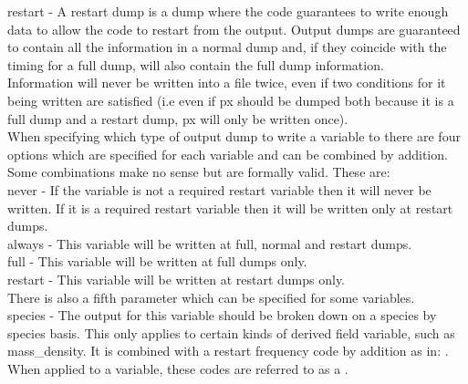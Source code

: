 {\emphtext restart} - A restart dump is a dump where the code guarantees to
write enough data to allow the code to restart from the output. Output dumps
are guaranteed to contain all the information in a normal dump and, if they
coincide with the timing for a full dump, will also contain the full dump
information.\\

Information will never be written into a file twice, even if two conditions for
it being written are satisfied (i.e even if px should be dumped both because it
is a full dump and a restart dump, px will only be written once).\\

When specifying which type of output dump to write a variable to there are four
options which are specified for each variable and can be combined by
addition. Some combinations make no sense but are formally
valid. These are:\\

{\emphtext never} - If the variable is not a required restart variable then it
will never be written. If it is a required restart variable then it will be
written only at restart dumps.\\

{\emphtext always} - This variable will be written at full, normal and restart
dumps.\\

{\emphtext full} - This variable will be written at full dumps only.\\

{\emphtext restart} - This variable will be written at restart dumps only.\\

There is also a fifth parameter which can be specified for some variables.\\

{\emphtext species} - The output for this variable should be broken down on a
species by species basis. This only applies to certain kinds of derived field
variable, such as mass\_density. It is combined with a restart frequency code
by addition as in: .\\

When applied to a variable, these codes are referred to as a
.

